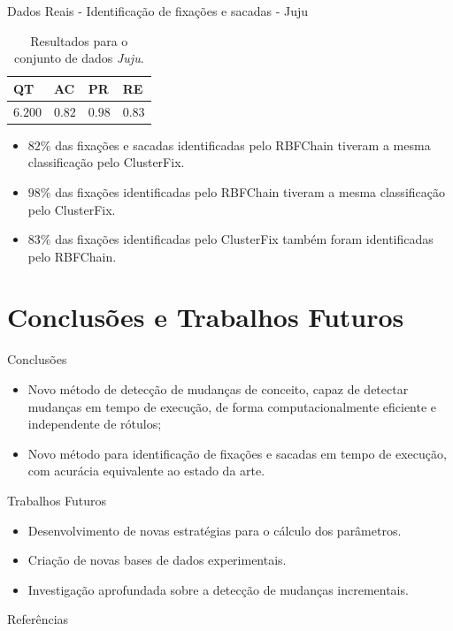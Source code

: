 \documentclass[10pt]{beamer}
\begin{document}
\begin{frame}{Dados Reais - Identificação de fixações e sacadas -  Juju}
    \begin{table}[ht!]
        \centering
        \caption{Resultados para o conjunto de dados \textit{Juju}.}
        \label{tbl:juju}
        \begin{tabular}{llll}

        \toprule
        QT              & AC                     & PR                     & RE      \\
        \midrule
        $6.200$         & $0.82$                 & $0.98$                 & $0.83$      \\
        \bottomrule

        \end{tabular}
    \end{table}

    \begin{itemize}
        \item \alert{$82\%$} das fixações e sacadas identificadas pelo RBFChain tiveram a mesma classificação pelo ClusterFix.
        \item \alert{$98\%$} das fixações identificadas pelo RBFChain tiveram a mesma classificação pelo ClusterFix.
        \item \alert{$83\%$} das fixações identificadas pelo ClusterFix também foram identificadas pelo RBFChain.
    \end{itemize}
\end{frame}

\section{Conclusões e Trabalhos Futuros}

\begin{frame}{Conclusões}
    \begin{itemize}
        \item Novo método de detecção de mudanças de conceito, capaz de detectar mudanças em tempo de execução, de forma computacionalmente eficiente e independente de rótulos;
        \item Novo método para identificação de fixações e sacadas em tempo de execução, com acurácia equivalente ao estado da arte.
    \end{itemize}
\end{frame}

\begin{frame}{Trabalhos Futuros}
    \begin{itemize}
        \item Desenvolvimento de novas estratégias para o cálculo dos parâmetros.
        \item Criação de novas bases de dados experimentais.
        \item Investigação aprofundada sobre a detecção de mudanças incrementais.
    \end{itemize}
\end{frame}

\begin{frame}[allowframebreaks]{Referências}

  
  

\end{frame}
\end{document}
